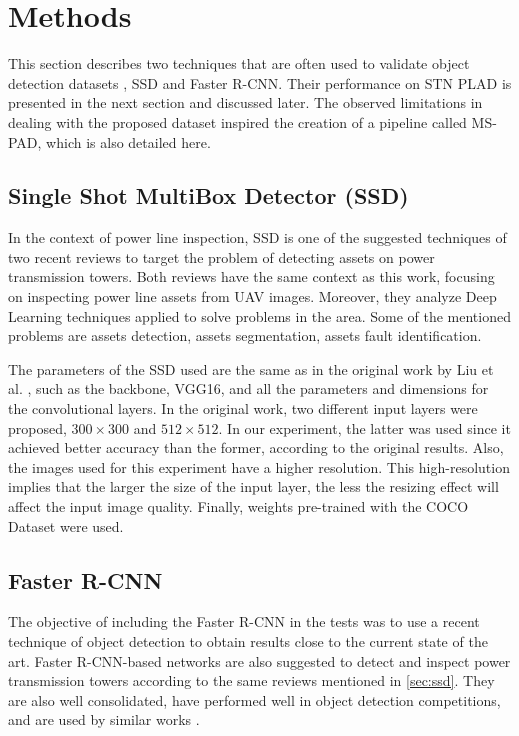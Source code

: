 \documentclass[10pt,conference]{IEEEtran}
\begin{document}
\section{Methods}
\label{sec:methodology}

This section describes two techniques that are often used to validate object detection datasets \cite{tao2018cplid}, SSD and Faster R-CNN. Their performance on STN PLAD is presented in the next section and discussed later. The observed limitations in dealing with the proposed dataset inspired the creation of a pipeline called MS-PAD, which is also detailed here.

\subsection{Single Shot MultiBox Detector (SSD)}
\label{sec:ssd}

In the context of power line inspection, SSD is one of the suggested techniques of two recent reviews \cite{liu2020review, nguyen2018automatic} to target the problem of detecting assets on power transmission towers. Both reviews have the same context as this work, focusing on inspecting power line assets from UAV images. Moreover, they analyze Deep Learning techniques applied to solve problems in the area. Some of the mentioned problems are assets detection, assets segmentation, assets fault identification.

The parameters of the SSD used are the same as in the original work by Liu et al. \cite{liu2016ssd}, such as the backbone, VGG16, and all the parameters and dimensions for the convolutional layers. In the original work, two different input layers were proposed, $300\times300$ and $512\times512$. In our experiment, the latter was used since it achieved better accuracy than the former, according to the original results. Also, the images used for this experiment have a higher resolution. This high-resolution implies that the larger the size of the input layer, the less the resizing effect will affect the input image quality. Finally, weights pre-trained with the COCO Dataset \cite{lin2014microsoft} were used. 



\subsection{Faster R-CNN}
\label{sec:fasterrcnn}
The objective of including the Faster R-CNN \cite{ren2015faster} in the tests was to use a recent technique of object detection to obtain results close to the current state of the art. Faster R-CNN-based networks are also suggested to detect and inspect power transmission towers according to the same reviews mentioned in \autoref{sec:ssd}. They are also well consolidated, have performed well in object detection competitions, and are used by similar works \cite{liu2020review, nguyen2018automatic}. 
\end{document}
